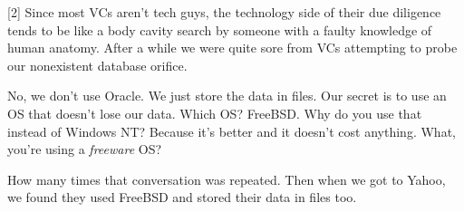 {[}2{]} Since most VCs aren't tech guys, the technology side of their
due diligence tends to be like a body cavity search by someone with a
faulty knowledge of human anatomy. After a while we were quite sore from
VCs attempting to probe our nonexistent database orifice.

No, we don't use Oracle. We just store the data in files. Our secret is
to use an OS that doesn't lose our data. Which OS? FreeBSD. Why do you
use that instead of Windows NT? Because it's better and it doesn't cost
anything. What, you're using a \emph{freeware} OS?

How many times that conversation was repeated. Then when we got to
Yahoo, we found they used FreeBSD and stored their data in files too.
